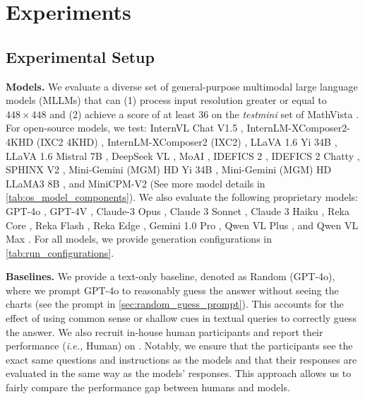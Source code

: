 \section{Experiments}
\label{sec:experiments}
\subsection{Experimental Setup}
\label{subsec:exp_setup}
\textbf{Models.  }We evaluate a diverse set of general-purpose multimodal large language models (MLLMs) that can (1) process input resolution greater or equal to $448 \times 448$ and (2) achieve a score of at least 36 on the \textit{testmini} set of MathVista \cite{lu2024mathvista}.
For open-source models, we test: InternVL Chat V1.5 \cite{chen2024far}, InternLM-XComposer2-4KHD (IXC2 4KHD) \cite{dong2024internlmxcomposer24khd}, InternLM-XComposer2 (IXC2) \cite{chen2023internvl}, LLaVA 1.6 Yi 34B \cite{liu2024llavanext}, LLaVA 1.6 Mistral 7B \cite{liu2024llavanext}, DeepSeek VL \cite{lu2024deepseekvl}, MoAI \cite{lee2024moai}, IDEFICS 2 \cite{laurenccon2024matters}, IDEFICS 2 Chatty \cite{laurenccon2024matters}, SPHINX V2 \cite{gao2024sphinxx}, Mini-Gemini (MGM) HD Yi 34B \cite{li2024minigemini}, Mini-Gemini (MGM) HD LLaMA3 8B \cite{li2024minigemini}, and MiniCPM-V2 \cite{viscpm} (See more model details in \cref{tab:os_model_components}). 
We also evaluate the following proprietary models: GPT-4o \cite{openai2024gpt4}, GPT-4V \cite{openai2024gpt4}, Claude-3 Opus \cite{claude3}, Claude 3 Sonnet \cite{claude3}, Claude 3 Haiku \cite{claude3}, Reka Core \cite{rekateam2024reka}, Reka Flash \cite{rekateam2024reka}, Reka Edge \cite{rekateam2024reka}, Gemini 1.0 Pro \cite{team2023gemini}, Qwen VL Plus \cite{bai2023qwenvl}, and Qwen VL Max \cite{bai2023qwenvl}.
For all models, we provide generation configurations in \cref{tab:run_configurations}.

\textbf{Baselines.  }We provide a text-only baseline, denoted as Random (GPT-4o), where we prompt GPT-4o to reasonably guess the answer without seeing the charts (see the prompt in \cref{sec:random_guess_prompt}). 
This accounts for the effect of using common sense or shallow cues in textual queries to correctly guess the answer.
We also recruit in-house human participants and report their performance (\textit{i.e.,} Human) on \ours{}.
Notably, we ensure that the participants see the exact same questions and instructions as the models and that their responses are evaluated in the same way as the models' responses. This approach allows us to fairly compare the performance gap between humans and models.


